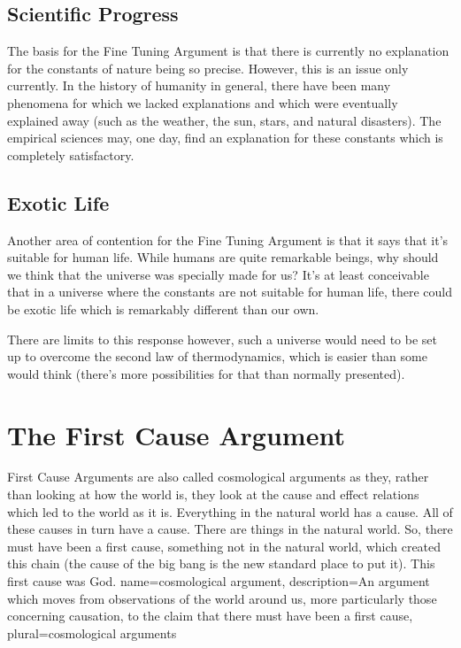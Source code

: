 \subsection{Scientific Progress}

The basis for the Fine Tuning Argument is that there is currently no explanation for the constants of nature being so precise. However, this is an issue only currently. In the history of humanity in general, there have been many phenomena for which we lacked explanations and which were eventually explained away (such as the weather, the sun, stars, and natural disasters). The empirical sciences may, one day, find an explanation for these constants which is completely satisfactory. 
\subsection{Exotic Life}

Another area of contention for the Fine Tuning Argument is that it says that it's suitable for human life. While humans are quite remarkable beings, why should we think that the universe was specially made for us? It's at least conceivable that in a universe where the constants are not suitable for human life, there could be exotic life which is remarkably different than our own. 

There are limits to this response however, such a universe would need to be set up to overcome the second law of thermodynamics, which is easier than some would think (there's more possibilities for that than normally presented).

\section{The First Cause Argument}
First Cause Arguments are also called \glspl{cosmological argument} as they, rather than looking at how the world is, they look at the cause and effect relations which led to the world as it is. Everything in the natural world has a cause. All of these causes in turn have a cause. There are things in the natural world. So, there must have been a first cause, something not in the natural world, which created this chain (the cause of the big bang is the new standard place to put it). This first cause was God. 
{
name=cosmological argument,
description={An argument which moves from observations of the world around us, more particularly those concerning causation, to the claim that there must have been a first cause},
plural=cosmological arguments
}



